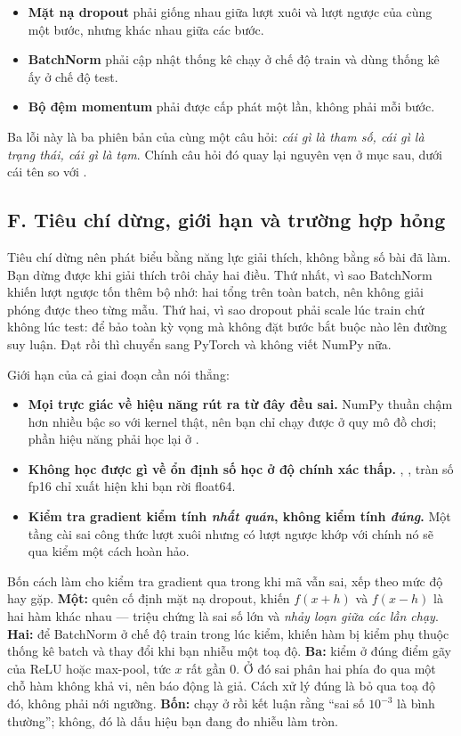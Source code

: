 \documentclass[../../../deep_learning.tex]{subfiles}
\begin{document}
\begin{itemize}
\item \textbf{Mặt nạ dropout} phải giống nhau giữa lượt xuôi và lượt ngược của cùng một bước, nhưng khác nhau giữa các bước.
\item \textbf{BatchNorm} phải cập nhật thống kê chạy ở chế độ train và dùng thống kê ấy ở chế độ test.
\item \textbf{Bộ đệm momentum} phải được cấp phát một lần, không phải mỗi bước.
\end{itemize}

Ba lỗi này là ba phiên bản của cùng một câu hỏi: \emph{cái gì là tham số, cái gì là trạng thái, cái gì là tạm}. Chính câu hỏi đó quay lại nguyên vẹn ở mục sau, dưới cái tên  so với .

\subsection{F. Tiêu chí dừng, giới hạn và trường hợp hỏng}
Tiêu chí dừng nên phát biểu bằng năng lực giải thích, không bằng số bài đã làm. Bạn dừng được khi giải thích trôi chảy hai điều. Thứ nhất, vì sao BatchNorm khiến lượt ngược tốn thêm bộ nhớ: hai tổng trên toàn batch, nên không giải phóng được theo từng mẫu. Thứ hai, vì sao dropout phải scale lúc train chứ không lúc test: để bảo toàn kỳ vọng mà không đặt bước bắt buộc nào lên đường suy luận. Đạt rồi thì chuyển sang PyTorch và không viết NumPy nữa.

Giới hạn của cả giai đoạn cần nói thẳng:

\begin{itemize}
\item \textbf{Mọi trực giác về hiệu năng rút ra từ đây đều sai.} NumPy thuần chậm hơn nhiều bậc so với kernel thật, nên bạn chỉ chạy được ở quy mô đồ chơi; phần hiệu năng phải học lại ở .
\item \textbf{Không học được gì về ổn định số học ở độ chính xác thấp.} , , tràn số fp16 chỉ xuất hiện khi bạn rời float64.
\item \textbf{Kiểm tra gradient kiểm tính \emph{nhất quán}, không kiểm tính \emph{đúng}.} Một tầng cài sai công thức lượt xuôi nhưng có lượt ngược khớp với chính nó sẽ qua kiểm một cách hoàn hảo.
\end{itemize}

\begin{cambay}
Bốn cách làm cho kiểm tra gradient qua trong khi mã vẫn sai, xếp theo mức độ hay gặp. \textbf{Một:} quên cố định mặt nạ dropout, khiến $f(x+h)$ và $f(x-h)$ là hai hàm khác nhau --- triệu chứng là sai số lớn và \emph{nhảy loạn giữa các lần chạy}. \textbf{Hai:} để BatchNorm ở chế độ train trong lúc kiểm, khiến hàm bị kiểm phụ thuộc thống kê batch và thay đổi khi bạn nhiễu một toạ độ. \textbf{Ba:} kiểm ở đúng điểm gãy của ReLU hoặc max-pool, tức $x$ rất gần 0. Ở đó sai phân hai phía đo qua một chỗ hàm không khả vi, nên báo động là giả. Cách xử lý đúng là bỏ qua toạ độ đó, không phải nới ngưỡng. \textbf{Bốn:} chạy ở  rồi kết luận rằng ``sai số $10^{-3}$ là bình thường''; không, đó là dấu hiệu bạn đang đo nhiễu làm tròn.
\end{cambay}
\end{document}
